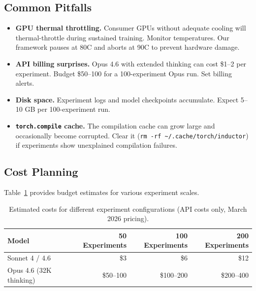 \documentclass[11pt]{article}
\begin{document}
\subsection{Common Pitfalls}
\label{sec:pitfalls}

\begin{itemize}[leftmargin=*]
    \item \textbf{GPU thermal throttling.} Consumer GPUs without adequate cooling will thermal-throttle during sustained training. Monitor temperatures. Our framework pauses at 80\textdegree C and aborts at 90\textdegree C to prevent hardware damage.
    \item \textbf{API billing surprises.} Opus 4.6 with extended thinking can cost \$1--2 per experiment. Budget \$50--100 for a 100-experiment Opus run. Set billing alerts.
    \item \textbf{Disk space.} Experiment logs and model checkpoints accumulate. Expect 5--10 GB per 100-experiment run.
    \item \textbf{\texttt{torch.compile} cache.} The compilation cache can grow large and occasionally become corrupted. Clear it (\texttt{rm -rf \~{}/.cache/torch/inductor}) if experiments show unexplained compilation failures.
\end{itemize}

\subsection{Cost Planning}
\label{sec:cost_planning}

Table~\ref{tab:budget} provides budget estimates for various experiment scales.

\begin{table}[H]
\centering
\caption{Estimated costs for different experiment configurations (API costs only, March 2026 pricing).}
\label{tab:budget}
\begin{tabular}{lrrr}
\toprule
\textbf{Model} & \textbf{50 Experiments} & \textbf{100 Experiments} & \textbf{200 Experiments} \\
\midrule
Sonnet 4 / 4.6 & \$3 & \$6 & \$12  \\
Opus 4.6 (32K thinking) & \$50--100 & \$100--200 & \$200--400 \\
\bottomrule
\end{tabular}
\end{table}
\end{document}
